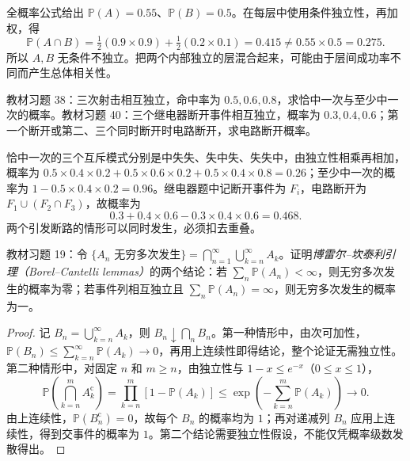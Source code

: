 \begin{solve}
全概率公式给出 $\mathbb P(A)=0.55$、$\mathbb P(B)=0.5$。在每层中使用条件独立性，再加权，得
\[
 \mathbb P(A\cap B)=\tfrac12(0.9\times0.9)+\tfrac12(0.2\times0.1)
 =0.415\ne0.55\times0.5=0.275.
\]
所以 $A,B$ 无条件不独立。把两个内部独立的层混合起来，可能由于层间成功率不同而产生总体相关性。
\end{solve}

\begin{example}
\label{ex:study-exercise-independent-patterns}
教材习题 38：三次射击相互独立，命中率为 $0.5,0.6,0.8$，求恰中一次与至少中一次的概率。教材习题 40：三个继电器断开事件相互独立，概率为 $0.3,0.4,0.6$；第一个断开或第二、三个同时断开时电路断开，求电路断开概率。
\end{example}

\begin{solve}
恰中一次的三个互斥模式分别是中失失、失中失、失失中，由独立性相乘再相加，概率为 $0.5\times0.4\times0.2+0.5\times0.6\times0.2+0.5\times0.4\times0.8=0.26$；至少中一次的概率为 $1-0.5\times0.4\times0.2=0.96$。继电器题中记断开事件为 $F_i$，电路断开为 $F_1\cup(F_2\cap F_3)$，故概率为
\[
 0.3+0.4\times0.6-0.3\times0.4\times0.6=0.468.
\]
两个引发断路的情形可以同时发生，必须扣去重叠。
\end{solve}

\begin{example}
\label{ex:study-exercise-borel-cantelli}
教材习题 19：令 $\{A_n\text{ 无穷多次发生}\}=\bigcap_{n=1}^{\infty}\bigcup_{k=n}^{\infty}A_k$。证明\emph{博雷尔--坎泰利引理（Borel--Cantelli lemmas）}的两个结论：若 $\sum_n\mathbb P(A_n)<\infty$，则无穷多次发生的概率为零；若事件列相互独立且 $\sum_n\mathbb P(A_n)=\infty$，则无穷多次发生的概率为一。
\end{example}

\begin{proof}
记 $B_n=\bigcup_{k=n}^{\infty}A_k$，则 $B_n\downarrow\bigcap_n B_n$。第一种情形中，由次可加性，$\mathbb P(B_n)\le\sum_{k=n}^{\infty}\mathbb P(A_k)\to0$，再用上连续性即得结论，整个论证无需独立性。第二种情形中，对固定 $n$ 和 $m\ge n$，由独立性与 $1-x\le e^{-x}$（$0\le x\le1$），
\[
 \mathbb P\!\left(\bigcap_{k=n}^{m}A_k^{\mathrm c}\right)
 =\prod_{k=n}^{m}[1-\mathbb P(A_k)]
 \le\exp\!\left(-\sum_{k=n}^{m}\mathbb P(A_k)\right)\longrightarrow0.
\]
由上连续性，$\mathbb P(B_n^{\mathrm c})=0$，故每个 $B_n$ 的概率均为 $1$；再对递减列 $B_n$ 应用上连续性，得到交事件的概率为 $1$。第二个结论需要独立性假设，不能仅凭概率级数发散得出。
\end{proof}





